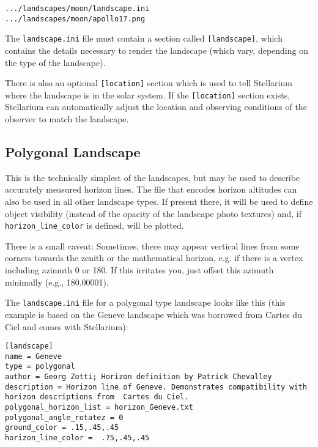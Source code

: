 \texttt{.../landscapes/moon/landscape.ini}\\
\texttt{.../landscapes/moon/apollo17.png}

The \texttt{landscape.ini} file must contain a section called
\texttt{{[}landscape{]}}, which contains the details necessary to render
the landscape (which vary, depending on the type of the landscape).

There is also an optional \texttt{{[}location{]}} section which is used
to tell Stellarium where the landscape is in the solar system. If the
\texttt{{[}location{]}} section exists, Stellarium can automatically
adjust the location and observing conditions of the observer to match
the landscape.

\subsection{Polygonal Landscape}\label{polygonal-line-method}

This is the technically simplest of the landscapes, but may be used to
describe accurately measured horizon lines. The file that encodes
horizon altitudes can also be used in all other landscape types. If
present there, it will be used to define object visibility (instead of
the opacity of the landscape photo textures) and, if
\texttt{horizon\_line\_color} is defined, will be plotted.

There is a small caveat: Sometimes, there may appear vertical lines from
some corners towards the zenith or the mathematical horizon, e.g. if
there is a vertex including azimuth 0 or 180. If this irritates you,
just offset this azimuth minimally (e.g., 180.00001).

The \texttt{landscape.ini} file for a polygonal type landscape looks
like this (this example is based on the Geneve landscape which was
borrowed from Cartes du Ciel and comes with Stellarium):

\begin{config}
\texttt{{[}landscape{]}}\\
\texttt{name~=~Geneve}\\
\texttt{type~=~polygonal}\\
\texttt{author~=~Georg~Zotti;~Horizon~definition~by~Patrick~Chevalley}\\
\texttt{description~=~Horizon~line~of~Geneve.~Demonstrates~compatibility~with~horizon~descriptions~from~~Cartes~du~Ciel.}\\
\texttt{polygonal\_horizon\_list~=~horizon\_Geneve.txt}\\
\texttt{polygonal\_angle\_rotatez~=~0}\\
\texttt{ground\_color~=~.15,.45,.45}\\
\texttt{horizon\_line\_color~=~~.75,.45,.45}
\end{config}

